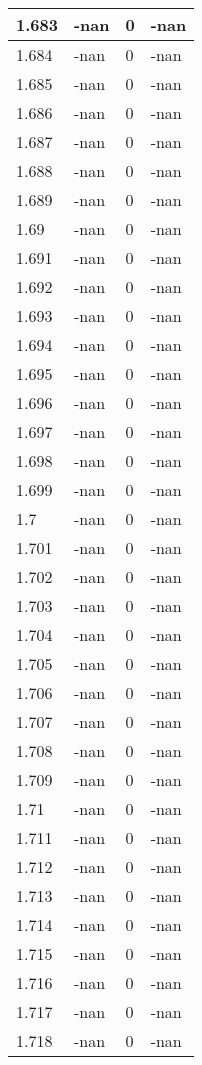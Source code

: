 \documentclass[a4paper,14pt]{extarticle}
\begin{document}
\begin{longtable}{||m{3cm}||m{3cm}|m{3cm}||m{3cm}||}
\hline
1.683 & -nan & 0 & -nan\\
\hline
1.684 & -nan & 0 & -nan\\
\hline
1.685 & -nan & 0 & -nan\\
\hline
1.686 & -nan & 0 & -nan\\
\hline
1.687 & -nan & 0 & -nan\\
\hline
1.688 & -nan & 0 & -nan\\
\hline
1.689 & -nan & 0 & -nan\\
\hline
1.69 & -nan & 0 & -nan\\
\hline
1.691 & -nan & 0 & -nan\\
\hline
1.692 & -nan & 0 & -nan\\
\hline
1.693 & -nan & 0 & -nan\\
\hline
1.694 & -nan & 0 & -nan\\
\hline
1.695 & -nan & 0 & -nan\\
\hline
1.696 & -nan & 0 & -nan\\
\hline
1.697 & -nan & 0 & -nan\\
\hline
1.698 & -nan & 0 & -nan\\
\hline
1.699 & -nan & 0 & -nan\\
\hline
1.7 & -nan & 0 & -nan\\
\hline
1.701 & -nan & 0 & -nan\\
\hline
1.702 & -nan & 0 & -nan\\
\hline
1.703 & -nan & 0 & -nan\\
\hline
1.704 & -nan & 0 & -nan\\
\hline
1.705 & -nan & 0 & -nan\\
\hline
1.706 & -nan & 0 & -nan\\
\hline
1.707 & -nan & 0 & -nan\\
\hline
1.708 & -nan & 0 & -nan\\
\hline
1.709 & -nan & 0 & -nan\\
\hline
1.71 & -nan & 0 & -nan\\
\hline
1.711 & -nan & 0 & -nan\\
\hline
1.712 & -nan & 0 & -nan\\
\hline
1.713 & -nan & 0 & -nan\\
\hline
1.714 & -nan & 0 & -nan\\
\hline
1.715 & -nan & 0 & -nan\\
\hline
1.716 & -nan & 0 & -nan\\
\hline
1.717 & -nan & 0 & -nan\\
\hline
1.718 & -nan & 0 & -nan\\

\end{longtable}
\end{document}
